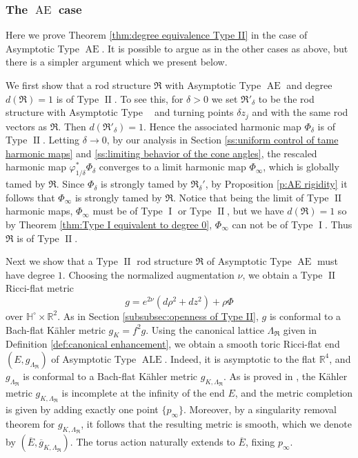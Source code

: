 \documentclass[a4paper,11pt]{amsart}
\theoremstyle{definition}
\numberwithin{equation}{section}
\newcommand{\R}{\mathbb{R}}
\newcommand{\mR} {\mathfrak R}
\DeclareMathOperator{\I}{I}
\DeclareMathOperator{\II}{II}
\DeclareMathOperator{\Ae}{AE}
\DeclareMathOperator{\ALE}{ALE}
\DeclareMathOperator{\ALFp}{ALF^+}
\begin{document}
\subsubsection{The  \texorpdfstring{$\Ae$}{} case} \label{sss:case Ae}

Here we prove Theorem \ref{thm:degree equivalence Type II} in the case of Asymptotic Type $\Ae$. It is possible to argue as in the other cases as above, but there is a simpler argument which we present below.

We first show that a rod structure $\mR$ with  Asymptotic Type  $\Ae$ and degree $d(\mR)=1$ is of Type $\II$. To see this, for $\delta>0$ we set $\mR'_{\delta}$ to be the rod structure with  Asymptotic Type  $\ALFp$ and turning points $\delta z_j$ and with the same rod vectors as $\mR$. Then $d(\mR'_{\delta})=1$. Hence the associated harmonic map $\Phi_\delta$ is of Type $\II$.  Letting $\delta\to0$, by our analysis in Section \ref{ss:uniform control of tame harmonic maps} and \ref{ss:limiting behavior of the cone angles}, the rescaled harmonic map $\varphi_{1/\delta}^*\Phi_\delta$ converges to a limit harmonic map $\Phi_\infty$, which is globally tamed by $\mR$. Since $\Phi_\delta$ is strongly tamed by $\mR_\delta'$, by Proposition \ref{p:AE rigidity} it follows that $\Phi_\infty$ is strongly tamed by $\mR$. Notice that being the limit of Type $\II$ harmonic maps,  $\Phi_\infty$ must be of Type $\I$ or Type $\II$, but we have $d(\mR)=1$ so by Theorem \ref{thm:Type I equivalent to degree 0}, $\Phi_\infty$ can not be of Type $\I$. Thus $\mR$ is of Type $\II$.

Next we show that a Type $\II$ rod structure $\mR$ of  Asymptotic Type  $\Ae$ must have degree $1$. Choosing the normalized augmentation $\nu$, we obtain a Type $\II$ Ricci-flat metric 
    $$g=e^{2\nu}(d\rho^2+dz^2)+\rho\Phi$$ 
over $\mathbb{H}^\circ\times\mathbb{R}^2$. As in Section \ref{subsubsec:openness of Type II}, $g$ is conformal to a Bach-flat K\"ahler metric $g_K=f^2g$. Using the canonical lattice $\Lambda_{\mR}$ given in Definition \ref{def:canonical enhancement}, we obtain a smooth toric Ricci-flat end $(E,g_{\Lambda_\mR})$ of Asymptotic Type $\ALE$. Indeed, it is asymptotic to the flat $\R^4$, and $g_{\Lambda_{\mR}}$ is conformal to a Bach-flat K\"ahler metric $g_{K,\Lambda_{\mR}}$. As is proved in \cite{Li1}, the K\"ahler metric $g_{K,\Lambda_\mR}$ is incomplete at the infinity of the end $E$, and  the metric completion is given by adding exactly one point $\{p_\infty\}$. Moreover, by  a singularity removal theorem for  $g_{K,\Lambda_\mR}$, it follows that the resulting metric is smooth, which we denote by $(\overline{E},\overline{g}_{K,\Lambda_\mR})$. The  torus action naturally extends to $\overline{E}$, fixing $p_\infty$. 
\end{document}
